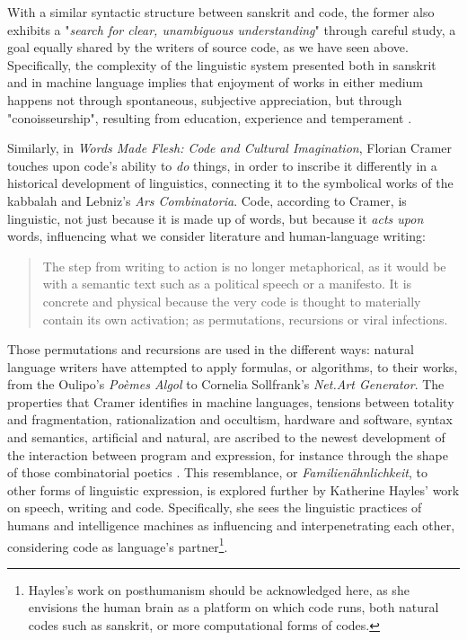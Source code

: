 With a similar syntactic structure between sanskrit and code, the former also exhibits a "\emph{search for clear, unambiguous understanding}" through careful study, a goal equally shared by the writers of source code, as we have seen above. Specifically, the complexity of the linguistic system presented both in sanskrit and in machine language implies that enjoyment of works in either medium happens not through spontaneous, subjective appreciation, but through "conoisseurship", resulting from education, experience and temperament \citep{chandra_geek_2014}.

Similarly, in \emph{Words Made Flesh: Code and Cultural Imagination}, Florian Cramer touches upon code's ability to \emph{do} things, in order to inscribe it differently in a historical development of linguistics, connecting it to the symbolical works of the kabbalah and Lebniz's \emph{Ars Combinatoria}. Code, according to Cramer, is linguistic, not just because it is made up of words, but because it \emph{acts upon} words, influencing what we consider literature and human-language writing:

\begin{quote}
  The step from writing to action is no longer metaphorical, as it would be with a semantic text such as a political speech or a manifesto. It is concrete and physical because the very code is thought to materially contain its own activation; as permutations, recursions or viral infections. \citep{cramer_words_2003}
\end{quote}

Those permutations and recursions are used in the different ways: natural language writers have attempted to apply formulas, or algorithms, to their works, from the Oulipo's \emph{Poèmes Algol} to Cornelia Sollfrank's \emph{Net.Art Generator}. The properties that Cramer identifies in machine languages, tensions between totality and fragmentation, rationalization and occultism, hardware and software, syntax and semantics, artificial and natural, are ascribed to the newest development of the interaction between program and expression, for instance through the shape of those combinatorial poetics \citep{cramer_words_2003}. This resemblance, or \emph{Familienähnlichkeit}, to other forms of linguistic expression, is explored further by Katherine Hayles' work on speech, writing and code. Specifically, she sees the linguistic practices of humans and intelligence machines as influencing and interpenetrating each other, considering code as language's partner\footnote{Hayles's work on posthumanism should be acknowledged here, as she envisions the human brain as a platform on which code runs, both natural codes such as sanskrit, or more computational forms of codes.}.

